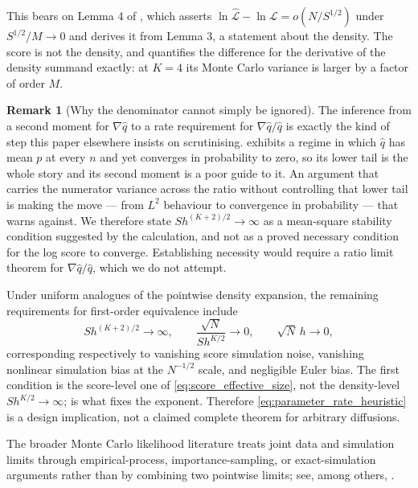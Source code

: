 \documentclass[11pt]{article}
\theoremstyle{definition}
\newtheorem{remark}[remark]{Remark}
\begin{document}
This bears on Lemma 4 of \citet{BrandtSantaClara2002}, which asserts $\ln\widehat{\mathcal L}-\ln\mathcal L=o(N/S^{1/2})$ under $S^{1/2}/M\to0$ and derives it from Lemma 3, a statement about the density. The score is not the density, and  quantifies the difference for the derivative of the density summand exactly: at $K=4$ its Monte Carlo variance is larger by a factor of order $M$.

\begin{remark}[Why the denominator cannot simply be ignored]\label{rem:score_denominator}
The inference from a second moment for $\nabla\widehat q$ to a rate requirement for $\nabla\widehat q/\widehat q$ is exactly the kind of step this paper elsewhere insists on scrutinising.  exhibits a regime in which $\widehat q$ has mean $p$ at every $n$ and yet converges in probability to zero, so its lower tail is the whole story and its second moment is a poor guide to it. An argument that carries the numerator variance across the ratio without controlling that lower tail is making the move --- from $L^2$ behaviour to convergence in probability --- that  warns against. We therefore state $Sh^{(K+2)/2}\to\infty$ as a mean-square stability condition suggested by the calculation, and not as a proved necessary condition for the log score to converge. Establishing necessity would require a ratio limit theorem for $\nabla\widehat q/\widehat q$, which we do not attempt.
\end{remark}

Under uniform analogues of the pointwise density expansion, the remaining requirements for first-order equivalence include
\begin{equation}\label{eq:parameter_rate_heuristic}
S h^{(K+2)/2}\to\infty,
\qquad
\frac{\sqrt N}{S h^{K/2}}\to0,
\qquad
\sqrt N\,h\to0,
\end{equation}
corresponding respectively to vanishing score simulation noise, vanishing nonlinear simulation bias at the $N^{-1/2}$ scale, and negligible Euler bias. The first condition is the score-level one of \eqref{eq:score_effective_size}, not the density-level $Sh^{K/2}\to\infty$;  is what fixes the exponent. Therefore \eqref{eq:parameter_rate_heuristic} is a design implication, not a claimed complete theorem for arbitrary diffusions.

The broader Monte Carlo likelihood literature treats joint data and simulation limits through empirical-process, importance-sampling, or exact-simulation arguments rather than by combining two pointwise limits; see, among others, \citet{Lee1995,SungGeyer2007,BeskosEtAl2009,MiasojedowEtAl2016}.
\end{document}
